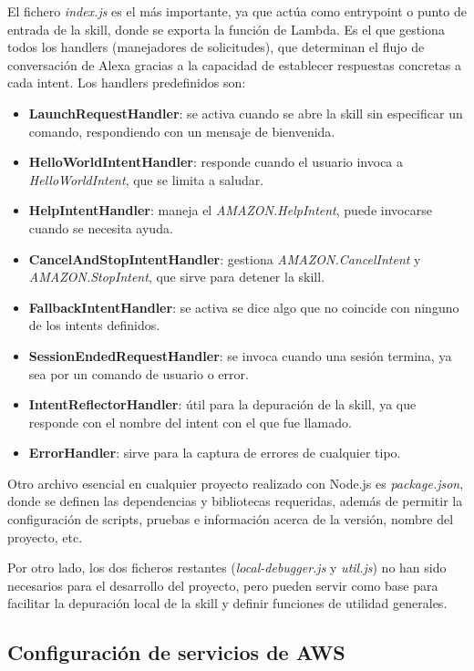 El fichero \textit{index.js} es el más importante, ya que actúa como entrypoint o punto de entrada de la skill, donde se exporta la función de Lambda. Es el que gestiona todos los handlers (manejadores de solicitudes), que determinan el flujo de conversación de Alexa gracias a la capacidad de establecer respuestas concretas a cada intent. Los handlers predefinidos son:
\begin{itemize}
	\item \textbf{LaunchRequestHandler}:  se activa cuando se abre la skill sin especificar un comando, respondiendo con un mensaje de bienvenida.
	\item \textbf{HelloWorldIntentHandler}: responde cuando el usuario invoca a \textit{HelloWorldIntent}, que se limita a saludar.
	\item \textbf{HelpIntentHandler}: maneja el \textit{AMAZON.HelpIntent}, puede invocarse cuando se necesita ayuda.
	\item \textbf{CancelAndStopIntentHandler}: gestiona \textit{AMAZON.CancelIntent} y \textit{AMAZON.StopIntent}, que sirve para detener la skill.
	\item \textbf{FallbackIntentHandler}: se activa se dice algo que no coincide con ninguno de los intents definidos.
	\item \textbf{SessionEndedRequestHandler}: se invoca cuando una sesión termina, ya sea por un comando de usuario o error.
	\item \textbf{IntentReflectorHandler}: útil para la depuración de la skill, ya que responde con el nombre del intent con el que fue llamado. 
	\item \textbf{ErrorHandler}: sirve para la captura de errores de cualquier tipo.
\end{itemize}

Otro archivo esencial en cualquier proyecto realizado con Node.js es \textit{package.json}, donde se definen las dependencias y bibliotecas requeridas, además de permitir la configuración de scripts, pruebas e información acerca de la versión, nombre del proyecto, etc.

Por otro lado, los dos ficheros restantes (\textit{local-debugger.js} y \textit{util.js}) no han sido necesarios para el desarrollo del proyecto, pero pueden servir como base para facilitar la depuración local de la skill y definir funciones de utilidad generales.

\subsection{Configuración de servicios de AWS}

